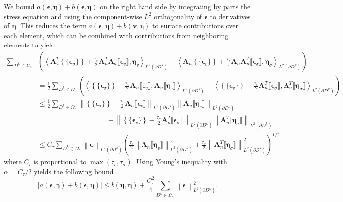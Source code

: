 \documentclass{siamart0216}
\newcommand{\nor}[1]{\left\| #1 \right\|}
\newcommand{\LRp}[1]{\left( #1 \right)}
\newcommand{\LRa}[1]{\left\langle #1 \right\rangle}
\newcommand{\LRb}[1]{\left| #1 \right|}
\newcommand{\LRc}[1]{\left\{ #1 \right\}}
\newcommand{\jump}[1] {\ensuremath{\llbracket#1\rrbracket}}
\newcommand{\avg}[1] {\ensuremath{\LRc{\!\{#1\}\!}}}
\newcommand{\Oh}{{\Omega_h}}
\newcommand{\Ldk}{L^2\LRp{\partial D^k}}
\begin{document}
We bound $a(\bm{\epsilon},\bm{\eta}) + b(\bm{\epsilon},\bm{\eta})$ on the right hand side by integrating by parts the stress equation and using the component-wise $L^2$ orthogonality of $\bm{\epsilon}$ to derivatives of $\bm{\eta}$.  This reduces the term $a(\bm{\epsilon},\bm{\eta}) + b(\bm{v},\bm{\eta})$ to surface contributions over each element, which can be combined with contributions from neighboring elements to yield
\begin{align*}
 \sum_{D^k\in \Oh}&\LRp{ \LRa{\bm{A}_n^T\avg{\bm{\epsilon}_\sigma} + \frac{\tau_v}{2}\bm{A}_n^T\bm{A}_n\jump{\bm{\epsilon}_v},\bm{\eta}_v}_{\Ldk} + \LRa{\bm{A}_n\avg{\bm{\epsilon}_v} + \frac{\tau_{\sigma}}{2}\bm{A}_n\bm{A}_n^T\jump{\bm{\epsilon}_\sigma},\bm{\eta}_\sigma}_{\Ldk}}\\
&= \frac{1}{2}\sum_{D^k\in \Oh}\LRp{ 
\LRa{\avg{\bm{\epsilon}_\sigma} - \frac{\tau_v}{2}\bm{A}_n\jump{\bm{\epsilon}_v},\bm{A}_n\jump{\bm{\eta}_v}}_{\Ldk} + \LRa{\avg{\bm{\epsilon}_v} - \frac{\tau_\sigma}{2}\bm{A}_n^T\jump{\bm{\epsilon}_\sigma},\bm{A}_n^T\jump{\bm{\eta}_{\sigma}}}_{\Ldk}}\\ %
&\leq \frac{1}{2}\sum_{D^k\in \Oh}\nor{\avg{\bm{\epsilon}_\sigma} - \frac{\tau_v}{2}\bm{A}_n\jump{\bm{\epsilon}_v}}_{\Ldk} \nor{\bm{A}_n\jump{\bm{\eta}_v}}_{\Ldk} \\
&\hspace{10em} + \nor{\avg{\bm{\epsilon}_v} - \frac{\tau_\sigma}{2}\bm{A}_n^T\jump{\bm{\epsilon}_\sigma}}_{\Ldk}\nor{\bm{A}_n^T\jump{\bm{\eta}_{\sigma}}}_{\Ldk}\\ 
&\leq C_\tau \sum_{D^k\in \Oh}\nor{\bm{\epsilon}}_{\Ldk} \LRp{\frac{\tau_v}{2}\nor{\bm{A}_n\jump{\bm{\eta}_v}}_{\Ldk}^2 + \frac{\tau_\sigma}{2}\nor{\bm{A}_n^T\jump{\bm{\eta}_{\sigma}}}_{\Ldk}^2}^{1/2}
\end{align*}
where $C_\tau$ is proportional to $\max\LRp{\tau_v, \tau_\sigma}$.  Using Young's inequality with $\alpha = C_\tau / 2$ yields the following bound 
\[
\LRb{a(\bm{\epsilon},\bm{\eta}) + b(\bm{\epsilon},\bm{\eta})} \leq {b(\bm{\eta},\bm{\eta})} + \frac{C_\tau^2 }{4} \sum_{D^k\in \Oh}\nor{\bm{\epsilon}}_{\Ldk}^2.
\]
\end{document}
